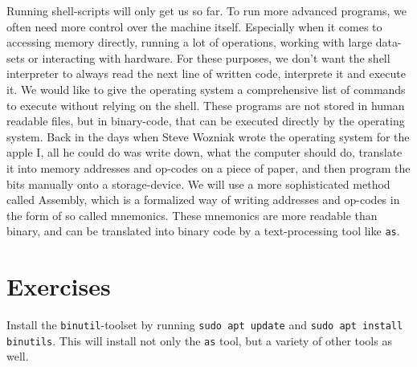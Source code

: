 \documentclass{dcbl/challenge}
\begin{document}
Running shell-scripts will only get us so far.
To run more advanced programs, we often need more control over the machine itself. 
Especially when it comes to accessing memory directly, running a lot of operations, working with large data-sets or interacting with hardware.
For these purposes, we don't want the shell interpreter to always read the next line of written code, interprete it and execute it.
We would like to give the operating system a comprehensive list of commands to execute without relying on the shell.
These programs are not stored in human readable files, but in binary-code, that can be executed directly by the operating system.
Back in the days when Steve Wozniak wrote the operating system for the apple I, all he could do was write down, what the computer should do, translate it into memory addresses and op-codes on a piece of paper, and then program the bits manually onto a storage-device.
We will use a more sophisticated method called Assembly, which is a formalized way of writing addresses and op-codes in the form of so called mnemonics. 
These mnemonics are more readable than binary, and can be translated into binary code by a text-processing tool like \texttt{as}.

\section*{Exercises}
\begin{aufgabe}
    Install the \texttt{binutil}-toolset by running \texttt{sudo apt update} and \texttt{sudo apt install binutils}.
    This will install not only the \texttt{as} tool, but a variety of other tools as well.
\end{aufgabe}
\end{document}
